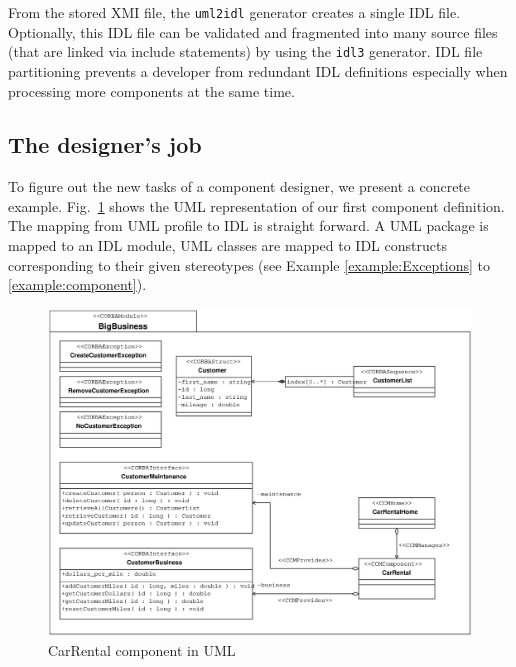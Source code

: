 From the stored XMI file, the {\tt uml2idl} generator creates a single IDL file.
Optionally, this IDL file can be validated and fragmented into many source files
(that are linked via include statements) by using the {\tt idl3} generator.
IDL file partitioning prevents a developer from redundant IDL definitions 
especially when processing more components at the same time.


\subsection{The designer's job}
To figure out the new tasks of a component designer, we present a concrete 
example.
Fig.~\ref{fig:uml-component-example} shows the UML representation of our first 
component definition.
The mapping from UML profile to IDL is straight forward. A UML 
package is mapped to an IDL module, UML classes are mapped to IDL constructs
corresponding to their given stereotypes (see Example \ref{example:Exceptions} 
to \ref{example:component}).
\begin{figure}[htb]
    \begin{center}
        \includegraphics [width=13cm,angle=0] {uml/Example1}
        \caption{CarRental component in UML}
        \label{fig:uml-component-example}
    \end{center}
\end{figure}

